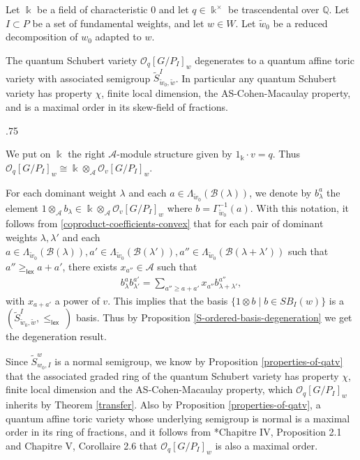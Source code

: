 \documentclass[11pt,fleqn]{article}
\makeatletter
\renewenvironment{proof}[1][\textit{Proof}]{\par
  \pushQED{\qed}%
  \normalfont \topsep.75\paraskip\relax
  \trivlist
  \item[\hskip\labelsep
        \itshape
    #1\@addpunct{.}]\ignorespaces
}{%
  \popQED\endtrivlist\@endpefalse
}
\newcommand\QQ{\mathbb Q}
\newcommand\ot{\otimes}
\newcommand\A{\mathcal A}
\newcommand\B{\mathcal B}
\newcommand\GG{\Gamma}
\renewcommand\O{\mathcal O}
\renewcommand\k{\Bbbk}
\newcommand\lex{\mathsf{lex}}
\newcommand\schubertbasis{SB}
\makeatother
\begin{document}
\begin{Theorem}
\label{Schubert-deg}
Let $\k$ be a field of characteristic $0$ and let $q \in \k^\times$ be 
trascendental over $\QQ$. Let $I \subset P$ be a set of fundamental weights, 
and let $w \in W$. Let $\tilde w_0$ be a reduced decomposition of $w_0$ 
adapted to $w$.

The quantum Schubert variety $\O_q[G/P_I]_w$ degenerates to a quantum affine 
toric variety with associated semigroup $\tilde S^I_{\tilde w_0, \tilde w}$. 
In particular any quantum Schubert variety has property $\chi$, finite local 
dimension, the AS-Cohen-Macaulay property, and is a maximal order in its 
skew-field of fractions.
\end{Theorem}
\begin{proof}
We put on $\k$ the right $\A$-module structure given by $1_\k \cdot v = q$.
Thus $\O_q[G/P_I]_w \cong \k \ot_\A \O_v[G/P_I]_w$. 

For each dominant weight $\lambda$ and each $a \in \Lambda_{\tilde w_0}
(\B(\lambda))$, we denote by $b^a_\lambda$ the element $1 \ot_\A b_\lambda
\in \k \ot_\A \O_v[G/P_I]_w$ where $b = \GG_{\tilde w_0}^{-1}(a)$.
With this notation, it follows from \ref{coproduct-coefficients-convex} that 
for each pair of dominant weights $\lambda, \lambda'$ and each $a \in 
\Lambda_{\tilde w_0}(\B(\lambda)), a' \in \Lambda_{\tilde w_0}(\B(\lambda')), 
a'' \in \Lambda_{\tilde w_0}(\B(\lambda + \lambda'))$ such that $a'' 
\geq_{\lex} a + a'$, there exists $x_{a''} \in \A$ such that 
\begin{align*}
b^a_{\lambda} b^{a'}_{\lambda'} = \sum_{a'' \geq a+a'} x_{a''} 
  b^{a''}_{\lambda + \lambda'},
\end{align*}
with $x_{a+a'}$ a power of $v$. This implies that the basis 
$\{1 \ot b \mid b \in \schubertbasis_I(w)\}$ is a $(\tilde S^I_{\tilde w_0, 
\tilde w}, \leq_{\lex}~)$ basis. Thus by Proposition 
\ref{S-ordered-basis-degeneration} we get the degeneration result.

Since $\tilde S^w_{w_0, I}$ is a normal semigroup, we know by Proposition 
\ref{properties-of-qatv} that the associated graded ring of the quantum 
Schubert variety has property $\chi$, finite local dimension and the 
AS-Cohen-Macaulay property, which $\O_q[G/P_I]_w$ inherits by Theorem 
\ref{transfer}. 
Also by Proposition \ref{properties-of-qatv}, a quantum affine toric variety 
whose underlying semigroup is normal is a maximal order in its ring of 
fractions, and it follows from \cite{Mau}*{Chapitre IV, Proposition 2.1 and 
Chapitre V, Corollaire 2.6} that $\O_q[G/P_I]_w$ is also a maximal order. 
\end{proof}
\end{document}
